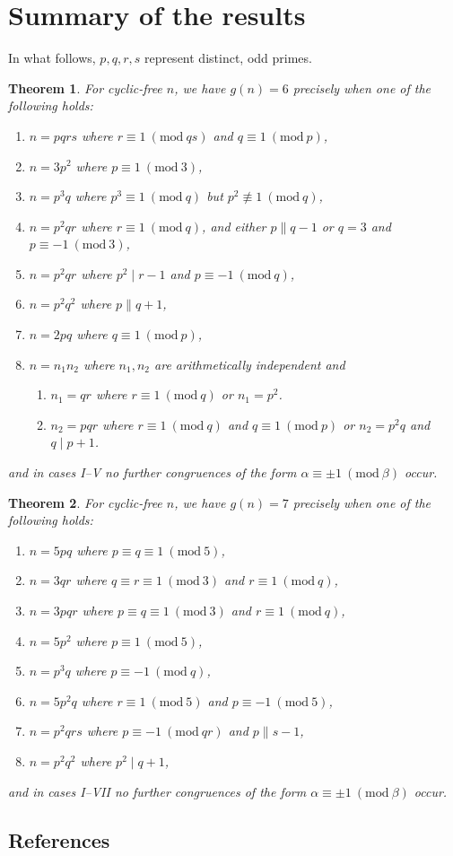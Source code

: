 \documentclass{article}
\newcommand{\Mod}[1]{\ (\mathrm{mod} \ #1)}
\theoremstyle{plain}
\newtheorem{thm}{Theorem}[section]
\theoremstyle{definition}
\begin{document}
\section{Summary of the results}
In what follows, $p, q, r, s$ represent distinct, odd primes.
\nopagebreak
{}
\begin{thm}
	For cyclic-free $n$, we have $g(n) = 6$ precisely when one of the following holds:
	\begin{enumerate} \listspace
		\item $n = pqrs$ where $r \equiv 1 \Mod{qs}$ and $q \equiv 1 \Mod{p}$,
		\item $n = 3p^2$ where $p \equiv 1 \Mod{3}$,
		\item $n = p^3 q$ where $p^3 \equiv 1 \Mod{q}$ but $p^2 \not\equiv 1 \Mod{q}$,
		\item $n = p^2 q r$ where $r \equiv 1 \Mod{q}$, and either $p \parallel q - 1$ or $q = 3$ and $p \equiv -1 \Mod{3}$,
		\item $n = p^2 q r$ where $p^2 \mid r - 1$ and $p \equiv -1 \Mod{q}$,
		\item $n = p^2 q^2$ where $p \parallel q + 1$,
		\item $n = 2pq$ where $q \equiv 1 \Mod{p}$,
		\item $n = n_1 n_2$ where $n_1, n_2$ are arithmetically independent and
		\begin{enumerate}
			\item $n_1 = qr$ where $r \equiv 1 \Mod{q}$ or $n_1 = p^2$.
			\item $n_2 = pqr$ where $r \equiv 1 \Mod{q}$ and $q \equiv 1 \Mod{p}$ or $n_2 = p^2 q$ and $q \mid p + 1$.
		\end{enumerate}
	\end{enumerate} \textspace
	and in cases I--V no further congruences of the form $\alpha \equiv \pm 1 \Mod{\beta}$ \nolinebreak[4] \mbox{occur}.
\end{thm}
\begin{thm}
	For cyclic-free $n$, we have $g(n) = 7$ precisely when one of the following holds:
	\begin{enumerate}	\listspace
		\item $n = 5pq$ where $p \equiv q \equiv 1 \Mod{5}$,
		\item $n = 3qr$ where $q \equiv r \equiv 1 \Mod{3}$ and $r \equiv 1 \Mod{q}$,
		\item $n = 3pqr$ where $p \equiv q \equiv 1 \Mod{3}$ and $r \equiv 1 \Mod{q}$,
		\item $n = 5p^2$ where $p \equiv 1 \Mod{5}$,
		\item $n = p^3 q$ where $p \equiv -1 \Mod{q}$,
		\item $n = 5p^2 q$ where $r \equiv 1 \Mod{5}$ and $p \equiv -1 \Mod{5}$,
		\item $n = p^2 q r s$ where $p \equiv -1 \Mod{qr}$ and $p \parallel s - 1$,
		\item $n = p^2 q^2$ where $p^2 \mid q + 1$,
	\end{enumerate} \textspace
	and in cases I--VII no further congruences of the form $\alpha \equiv \pm 1 \Mod{\beta}$ \nolinebreak[4] \mbox{occur}.
\end{thm}

\begin{center}\section*{References}\end{center}
\printbibliography[heading=none]
\end{document}
